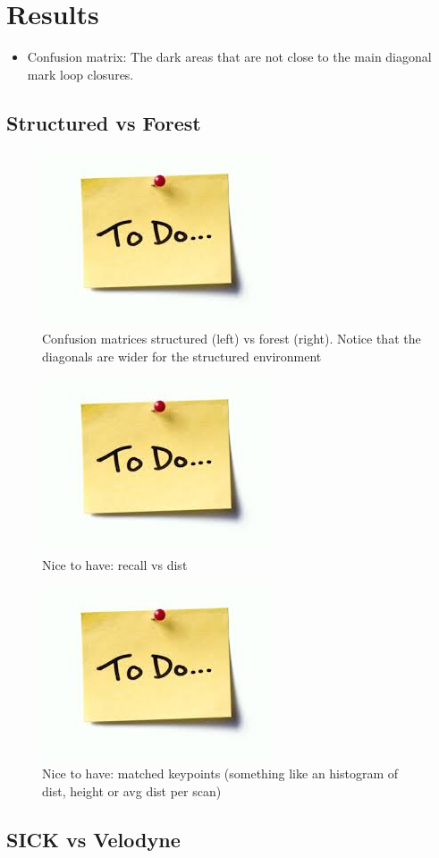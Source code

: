 \section{Results}
\label{sec:chap_slam_results}

\begin{itemize}
    \item Confusion matrix: The dark areas that are not close to the main diagonal mark loop closures.
\end{itemize}

\subsection{Structured vs Forest}
\label{ssec:chap_slam_struct_vs_forest}

\begin{figure}[htpb]
    \centering
    \includegraphics[width=0.2\linewidth]{img/todo.jpg}
    \caption{Confusion matrices structured (left) vs forest (right). Notice that the diagonals are wider for the structured environment}
    \label{fig:matrices_struct_vs_forest}
\end{figure}

\begin{figure}[htpb]
    \centering
    \includegraphics[width=0.2\linewidth]{img/todo.jpg}
    \caption{Nice to have: recall vs dist}
    \label{fig:recall_dist}
\end{figure}

\begin{figure}[htpb]
    \centering
    \includegraphics[width=0.2\linewidth]{img/todo.jpg}
    \caption{Nice to have: matched keypoints (something like an histogram of dist, height or avg dist per scan)}
    \label{fig:match_avg_dist}
\end{figure}

\subsection{SICK vs Velodyne}
\label{ssec:chap_slam_sick_vs_velodyne}
